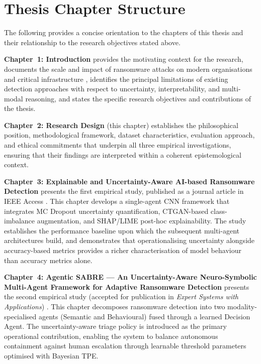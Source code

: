 \section{Thesis Chapter Structure}
\label{sec:chapter_structure}

The following provides a concise orientation to the chapters of this thesis and their
relationship to the research objectives stated above.

\textbf{Chapter~1: Introduction} provides the motivating context for the research, documents
the scale and impact of ransomware attacks on modern organisations and critical
infrastructure \cite{europol2020iocta, beaman2021ransomware}, identifies the principal
limitations of existing detection approaches with respect to uncertainty, interpretability,
and multi-modal reasoning, and states the specific research objectives and contributions of
the thesis.

\textbf{Chapter~2: Research Design} (this chapter) establishes the philosophical position,
methodological framework, dataset characteristics, evaluation approach, and ethical
commitments that underpin all three empirical investigations, ensuring that their findings
are interpreted within a coherent epistemological context.

\textbf{Chapter~3: Explainable and Uncertainty-Aware AI-based Ransomware Detection} presents
the first empirical study, published as a journal article in IEEE Access
\cite{kabuye2025explainable}.
This chapter develops a single-agent CNN framework that integrates MC Dropout uncertainty
quantification, CTGAN-based class-imbalance augmentation, and SHAP/LIME post-hoc
explainability.
The study establishes the performance baseline upon which the subsequent multi-agent
architectures build, and demonstrates that operationalising uncertainty alongside
accuracy-based metrics provides a richer characterisation of model behaviour than
accuracy metrics alone.

\textbf{Chapter~4: Agentic SABRE --- An Uncertainty-Aware Neuro-Symbolic Multi-Agent
Framework for Adaptive Ransomware Detection} presents the second empirical study
(accepted for publication in \emph{Expert Systems with Applications})
\cite{kabuye2026sabre}.
This chapter decomposes ransomware detection into two modality-specialised agents (Semantic
and Behavioural) fused through a learned Decision Agent.
The uncertainty-aware triage policy is introduced as the primary operational contribution,
enabling the system to balance autonomous containment against human escalation through
learnable threshold parameters optimised with Bayesian TPE.

